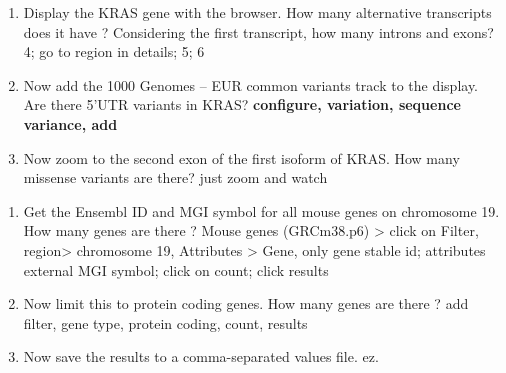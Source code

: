 \documentclass[11pt]{article}
\begin{document}
\begin{enumerate}
	\item Display the KRAS gene with the browser. How many alternative transcripts does it have ? Considering the first transcript, how many introns and exons? 4; go to region in details; 5; 6
	\item Now add the 1000 Genomes – EUR common variants track to the display. Are there 5'UTR variants in KRAS? \textbf{configure, variation, sequence variance, add}
	\item Now zoom to the second exon of the first isoform of KRAS. How many missense variants are there? just zoom and watch
\end{enumerate}

\begin{enumerate}
	\item Get the Ensembl ID and MGI symbol for all mouse genes on chromosome 19. How many genes are there ?  Mouse genes (GRCm38.p6) > click on Filter, region> chromosome 19, Attributes > Gene, only gene stable id; attributes external MGI symbol; click on count; click results
	\item Now limit this to protein coding genes. How many genes are there ? add filter, gene type, protein coding, count, results
	\item Now save the results to a comma-separated values file. ez.
\end{enumerate}
\end{document}
